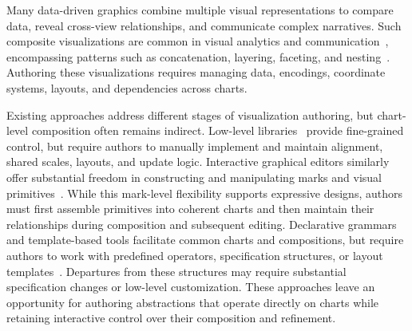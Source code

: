 
\maketitle

Many data-driven graphics combine multiple visual representations to compare
data, reveal cross-view relationships, and communicate complex narratives.
Such composite visualizations are common in visual analytics and
communication~\cite{vasurvey, Survey16, deng2023survey, AI4VIS}, encompassing
patterns such as concatenation, layering, faceting, and
nesting~\cite{javed2012exploring, Composite, vaid}. 
Authoring these visualizations requires managing data, encodings,
coordinate systems, layouts, and dependencies across charts. 


Existing approaches address different stages of visualization authoring, but
chart-level composition often remains indirect. Low-level libraries~\cite{bostock2011d3} provide
fine-grained control, but require authors to manually implement and maintain
alignment, shared scales, layouts, and update logic. Interactive graphical
editors similarly offer substantial freedom in constructing and manipulating
marks and visual primitives~\cite{Lyra, DataIllustrator}. While this
mark-level flexibility supports expressive designs, authors must first
assemble primitives into coherent charts and then maintain their relationships
during composition and subsequent editing. Declarative grammars and
template-based tools facilitate common charts and compositions, but require
authors to work with predefined operators, specification structures, or
layout templates~\cite{bostock2011d3, satyanarayan2016vega, Tableau}.
Departures from these structures may require substantial specification changes
or low-level customization. These approaches leave an opportunity for
authoring abstractions that operate directly on charts while retaining
interactive control over their composition and refinement.

